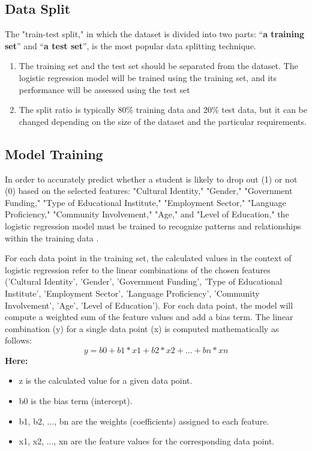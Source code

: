\documentclass[final,12p,twocolumn]{article}
\begin{document}
\subsection{\textbf{Data Split}}
The "train-test split," in which the dataset is divided into two parts: “\textbf{a training set}” and  “\textbf{a test set}”, is the most popular data splitting technique.
\begin{enumerate}
  \item The training set and the test set should be separated from the dataset. The logistic regression model will be trained using the training set, and its performance will be assessed using the test set
  \item The split ratio is typically 80\% training data and 20\% test data, but it can be changed depending on the size of the dataset and the particular requirements.
\end{enumerate}

\subsection{\textbf{Model Training}}

In order to accurately predict whether a student is likely to drop out (1) or not (0) based on the selected features: "Cultural Identity," "Gender," "Government Funding," "Type of Educational Institute," "Employment Sector," "Language Proficiency," "Community Involvement," "Age," and "Level of Education," the logistic regression model must be trained to recognize patterns and relationships within the training data \cite{r18}.

For each data point in the training set, the calculated values in the context of logistic regression refer to the linear combinations of the chosen features ('Cultural Identity', 'Gender', 'Government Funding', 'Type of Educational Institute', 'Employment Sector', 'Language Proficiency', 'Community Involvement', 'Age', 'Level of Education'). For each data point, the model will compute a weighted sum of the feature values and add a bias term. The linear combination (y) for a single data point (x) is computed mathematically as follows:\\
$$ y = b0 + b1 * x1 + b2 * x2 + ... + bn *xn $$
\textbf{Here:}
\begin{itemize}
  \item z is the calculated value for a given data point.
  \item b0 is the bias term (intercept).
  \item b1, b2, ..., bn are the weights (coefficients) assigned to each feature.
  \item x1, x2, ..., xn are the feature values for the corresponding data point.
\end{itemize}
\end{document}

